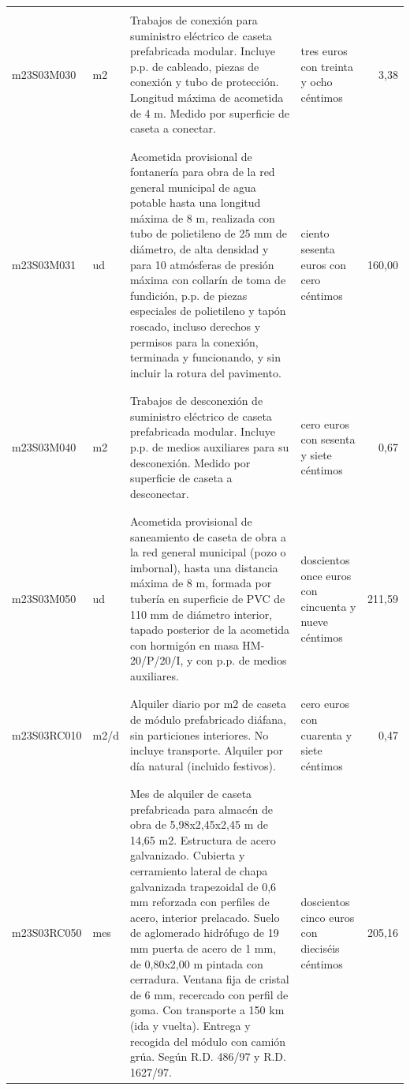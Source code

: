 \begin{supertabular}{|l|l|p{5cm}|p{3cm}|r|}
&&&&\\%
m23S03M030&m2&Trabajos de conexión para suministro eléctrico de caseta prefabricada modular. Incluye p.p. de cableado, piezas de conexión y tubo de protección. Longitud máxima de acometida de 4 m. Medido por superficie de caseta a conectar.&tres euros con treinta y ocho céntimos&3,38\\%
&&&&\\%
&&&&\\%
m23S03M031&ud&Acometida provisional de fontanería para obra de la red general municipal de agua potable hasta una longitud máxima de 8 m, realizada con tubo de polietileno de 25 mm de diámetro, de alta densidad y para 10 atmósferas de presión máxima con collarín de toma de fundición, p.p. de piezas especiales de polietileno y tapón roscado, incluso derechos y permisos para la conexión, terminada y funcionando, y sin incluir la rotura del pavimento.&ciento sesenta euros con cero céntimos&160,00\\%
&&&&\\%
&&&&\\%
m23S03M040&m2&Trabajos de desconexión de suministro eléctrico de caseta prefabricada modular. Incluye p.p. de medios auxiliares para su desconexión. Medido por superficie de caseta a desconectar.&cero euros con sesenta y siete céntimos&0,67\\%
&&&&\\%
&&&&\\%
m23S03M050&ud&Acometida provisional de saneamiento de caseta de obra a la red general municipal (pozo o imbornal), hasta una distancia máxima de 8 m, formada por tubería en superficie de PVC de 110 mm de diámetro interior, tapado posterior de la acometida con hormigón en masa HM{-}20/P/20/I, y con p.p. de medios auxiliares.&doscientos once euros con cincuenta y nueve céntimos&211,59\\%
&&&&\\%
&&&&\\%
m23S03RC010&m2/d&Alquiler diario por m2 de caseta de módulo prefabricado diáfana, sin particiones interiores. No incluye transporte. Alquiler por día natural (incluido festivos).&cero euros con cuarenta y siete céntimos&0,47\\%
&&&&\\%
&&&&\\%
m23S03RC050&mes&Mes de alquiler de caseta prefabricada para almacén de obra de 5,98x2,45x2,45 m de 14,65 m2. Estructura de acero galvanizado. Cubierta y cerramiento lateral de chapa galvanizada trapezoidal de 0,6 mm reforzada con perfiles de acero, interior prelacado. Suelo de aglomerado hidrófugo de 19 mm puerta de acero de 1 mm, de 0,80x2,00 m pintada con cerradura. Ventana fija de cristal de 6 mm, recercado con perfil de goma. Con transporte a 150 km (ida y vuelta). Entrega y recogida del módulo con camión grúa. Según R.D. 486/97 y R.D. 1627/97.&doscientos cinco euros con dieciséis céntimos&205,16\\%

\end{supertabular}

